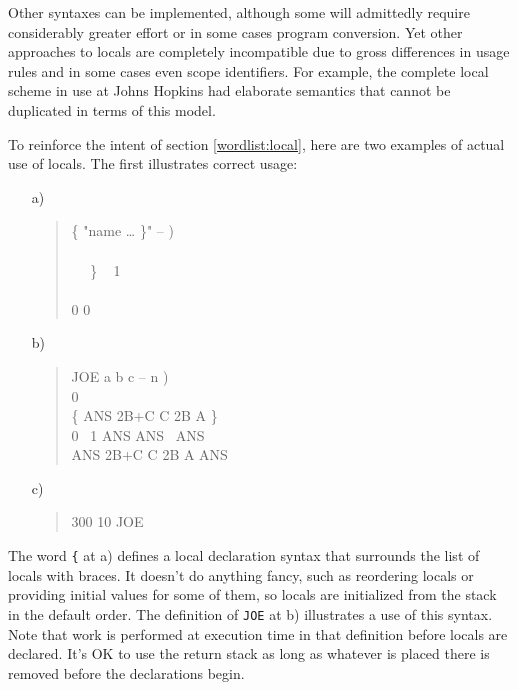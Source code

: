\begin{intro}
Other syntaxes can be implemented, although some will admittedly
require considerably greater effort or in some cases program
conversion. Yet other approaches to locals are completely incompatible
due to gross differences in usage rules and in some cases even scope
identifiers. For example, the complete local scheme in use at Johns
Hopkins had elaborate semantics that cannot be duplicated in terms of
this model.

To reinforce the intent of section \ref{wordlist:local}, here are
two examples of actual use of locals. The first illustrates correct
usage:

\begin{enumerate}
\item[a)] \begin{quote}\ttfamily
	\word{:} \{	 "name {\ldots} \}" -- ) \\
	\tab {} ~   \\
	\tab~~   \word{[CHAR]} \} \word{-} ~
		 1 \word{-} ~
		  \\
	\tab~~  \\
	\tab {}  0 0 \\
	\word{;} 
	\end{quote}

\item[b)] \begin{quote}\ttfamily
	\word{:} JOE  a b c -- n ) \\
	\tab {}    \word{+} 0 \\
	\tab \{ ANS 2B+C C 2B A \} \\
	 0 
		~1 ANS \word{+}  \word{+}  ANS
		~ANS  
	~ \\
	\tab ANS  2B+C  C  2B  A   ANS \\
	\word{;}
	\end{quote}

\item[c)] \begin{quote} 300 10 JOE 
	\end{quote}
\end{enumerate}

The word \texttt{\{} at a) defines a local declaration syntax that
surrounds the list of locals with braces. It doesn't do anything fancy,
such as reordering locals or providing initial values for some of them,
so locals are initialized from the stack in the default order. The
definition of \texttt{JOE} at b) illustrates a use of this syntax. Note
that work is performed at execution time in that definition before
locals are declared. It's OK to use the return stack as long as whatever
is placed there is removed before the declarations begin.


\end{intro}
